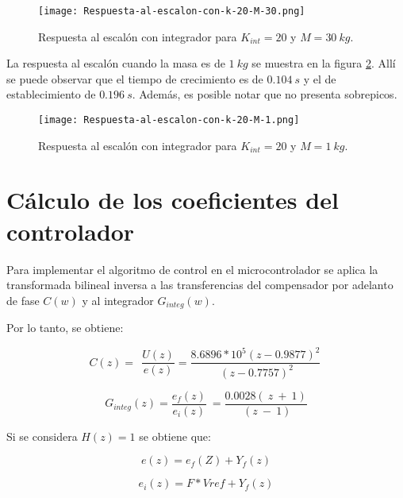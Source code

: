 \begin{figure}[H]
	\centering
	\texttt{[image: Respuesta-al-escalon-con-k-20-M-30.png]}
	\caption{Respuesta al escalón con integrador para $K_{int} =20$ y $M = 30\:kg$.}
	\label{fig:respuesta-al-escalon-con-k-20-M-30}
\end{figure}


\noindent La respuesta al escal\'{o}n cuando la masa es de $1\:kg$ se muestra en la figura \ref{fig:respuesta-al-escalon-con-k-20-M-1}. All\'{i} se puede observar que el tiempo de crecimiento es de $0.104\:s$ y el de establecimiento de $0.196\:s$. Adem\'{a}s, es posible notar que no presenta sobrepicos.



\begin{figure}[H]
	\centering
	\texttt{[image: Respuesta-al-escalon-con-k-20-M-1.png]}
	\caption{Respuesta al escalón con integrador para $K_{int} =20$ y $M=1\:kg$.}
	\label{fig:respuesta-al-escalon-con-k-20-M-1}
\end{figure}


\section{Cálculo de los coeficientes del controlador}

\noindent Para implementar el algoritmo de control en el microcontrolador se aplica la transformada bilineal inversa a las transferencias del compensador por adelanto de fase $C(w)$ y al integrador $G_{integ}(w)$.

\noindent Por lo tanto, se obtiene:

\begin{equation} \label{GrindEQ__5_6_} 
	C(z)=\ \ \frac{U(z)}{e(z)}=\frac{8.6896*10^5(z-0.9877)^2}{\ (z-0.7757)^2}\  
\end{equation} 

\begin{equation} \label{GrindEQ__5_7_} 
	G_{integ}(z)=\frac{e_f(z)}{e_i(z)}\ =\frac{0.0028(\ z\ +\ 1)}{\ (z\ -\ 1)} 
\end{equation} 

\noindent Si se considera $H(z)=1$ se obtiene que:

\begin{equation} \label{GrindEQ__5_39_} 
	e(z)=e_f(Z)+Y_f(z) 
\end{equation} 

\begin{equation} \label{GrindEQ__5_40_} 
	e_i(z)=F*Vref+Y_f(z) 
\end{equation} 


